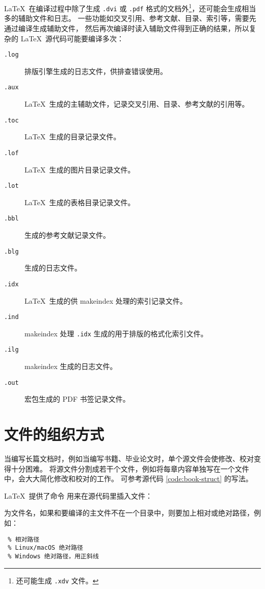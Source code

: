 \LaTeX\ 在编译过程中除了生成 \texttt{.dvi} 或 \texttt{.pdf} 格式的文档外\footnote{ 还可能生成 \texttt{.xdv} 文件。}，还可能会生成相当多的辅助文件和日志。
一些功能如交叉引用、参考文献、目录、索引等，需要先通过编译生成辅助文件，
然后再次编译时读入辅助文件得到正确的结果，所以复杂的 \LaTeX\ 源代码可能要编译多次：
\begin{description}
  \item[\texttt{.log}] 排版引擎生成的日志文件，供排查错误使用。
  \item[\texttt{.aux}] \LaTeX\ 生成的主辅助文件，记录交叉引用、目录、参考文献的引用等。
  \item[\texttt{.toc}] \LaTeX\ 生成的目录记录文件。
  \item[\texttt{.lof}] \LaTeX\ 生成的图片目录记录文件。
  \item[\texttt{.lot}] \LaTeX\ 生成的表格目录记录文件。
  \item[\texttt{.bbl}]  生成的参考文献记录文件。
  \item[\texttt{.blg}]  生成的日志文件。
  \item[\texttt{.idx}] \LaTeX\ 生成的供 makeindex 处理的索引记录文件。
  \item[\texttt{.ind}] makeindex 处理 \texttt{.idx} 生成的用于排版的格式化索引文件。
  \item[\texttt{.ilg}] makeindex 生成的日志文件。
  \item[\texttt{.out}]  宏包生成的 PDF 书签记录文件。
\end{description}

\section{文件的组织方式}\label{sec:latex-multi-files}

当编写长篇文档时，例如当编写书籍、毕业论文时，单个源文件会使修改、校对变得十分困难。
将源文件分割成若干个文件，例如将每章内容单独写在一个文件中，会大大简化修改和校对的工作。
可参考源代码 \ref{code:book-struct} 的写法。

\LaTeX\ 提供了命令  用来在源代码里插入文件：
\begin{command}
\end{command}
 为文件名，如果和要编译的主文件不在一个目录中，则要加上相对或绝对路径，例如：
\begin{verbatim}
 % 相对路径
 % Linux/macOS 绝对路径
 % Windows 绝对路径，用正斜线
\end{verbatim}

